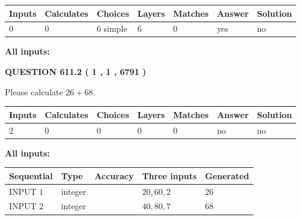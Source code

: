 \documentclass[12pt]{article}
\begin{document}
 
   
   
   
   
\noindent\begin{tabular}{|l|l|l|l|l|l|l|}
 \hline
Inputs & Calculates & Choices & Layers & Matches & Answer & Solution \\ \hline
 0  & 
 0  & 
 6
  simple  
  & 
 6  & 
 0  & 
  yes & 
  no 
  \\ \hline
 \end{tabular}
   
   
   
   
\noindent{}
   
   
   
   
\noindent\vspace{0.1in}\hspace{-0.08in} {\textbf{\Large{All inputs: }}}
   
   
  
\vspace{0.2in}
  
{\textbf{\Large{QUESTION
611.2 
 ( 1 , 1 , 6791 )
}}}
  
  
 
Please calculate $ %
26 +  %
68 $.
 
 
   
   
   
   
\noindent\begin{tabular}{|l|l|l|l|l|l|l|}
 \hline
Inputs & Calculates & Choices & Layers & Matches & Answer & Solution \\ \hline
 2  & 
 0  & 
 0
  & 
 0  & 
 0  & 
  no & 
  no 
  \\ \hline
 \end{tabular}
   
   
   
   
\noindent{}
   
   
   
   
\noindent\vspace{0.1in}\hspace{-0.08in} {\textbf{\Large{All inputs: }}}
   
   
  
  
\noindent\begin{tabular}{|l|l|l|l|l|}
\hline
 Sequential & Type & Accuracy & Three inputs & Generated \\ 
\hline
 
 
  INPUT $  1 $ & integer &  & $
 20
 , 
 60
 , 
 2
 $ & $ 26 $ 
 \\  \hline  
 
 
  INPUT $  2 $ & integer &  & $
 40
 , 
 80
 , 
 7
 $ & $ 68 $ 
 \\  \hline  
 \end{tabular}
   
\end{document}
